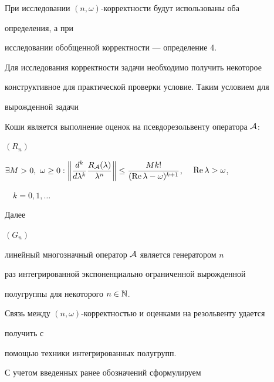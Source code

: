  


При исследовании $(n,\omega)$-корректности будут использованы оба 


определения, а при 


исследовании обобщенной корректности --- определение 4.


Для исследования корректности задачи необходимо получить некоторое 


конструктивное для практической проверки условие. Таким условием для 


вырожденной задачи 


Коши является выполнение оценок на псевдорезольвенту оператора $\cal A$: 


\medskip


 


\noindent{}$(R_n)$\hfil 


$\exists M>0,\ \omega\ge0:\bigg\|\dfrac{d^k}{d\lambda^k} 


\dfrac{R_{\cal A}(\lambda)}{\lambda^n}\bigg\|\le 


\dfrac{M k!}{(\re\lambda-\omega)^{k+1}}$, \ \ $\re\lambda>\omega$, 


\ \ $k=0,1,\dotsc$\hfil 


\medskip





\noindent{}Далее





\noindent{}$(G_n)$ \quad


линейный многозначный оператор $\cal A$ является генератором $n$ 


раз интегрированной экспоненциально ограниченной вырожденной 


полугруппы для некоторого $n\in\Bbb N$. 


\medskip


 


Связь между $(n,\omega)$-корректностью и оценками на резольвенту удается 


получить с 


помощью техники интегрированных полугрупп. 


С учетом введенных ранее обозначений сформулируем 


 



